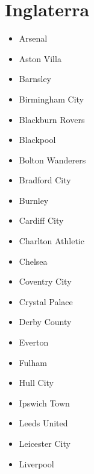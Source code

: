 \section{Inglaterra}
\begin{multicols}{2}
	\begin{itemize}
	    \setlength{\itemsep}{1pt}
	    \setlength{\parskip}{0pt}
	    \setlength{\parsep}{0pt}

	\item Arsenal

		\item Aston Villa

		\item Barnsley

		\item Birmingham City

		\item Blackburn Rovers

		\item Blackpool

		\item Bolton Wanderers

		\item Bradford City

		\item Burnley

		\item Cardiff City

		\item Charlton Athletic

		\item Chelsea

		\item Coventry City

		\item Crystal Palace

		\item Derby County

		\item Everton

		\item Fulham

		\item Hull City

		\item Ipswich Town

		\item Leeds United

		\item Leicester City

		\item Liverpool


\end{itemize}
\end{multicols}
